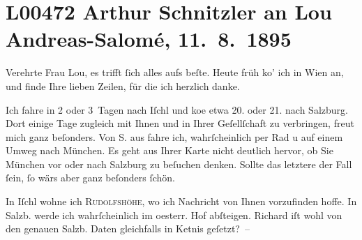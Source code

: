 

\section[Arthur Schnitzler an Lou Andreas-Salomé, 11. 8. 1895]{L00472 Arthur Schnitzler an Lou Andreas-Salomé, 11. 8. 1895}
\nopagebreak{}
\rehead{ }\normalsize\beginnumbering{}
\toendnotes[C]{\smallbreak\pagebreak[2]}
\pstart{}{\pb}Verehrte Frau Lou,\pend\vspace{0.5em}
\pstart
           es trifft ſich alles aufs beſte. Heute früh ko{\geminationm}’ ich in
                  Wien an, und  finde Ihre lieben Zeilen, für die ich herzlich danke.\pend
           
\pstart
           Ich fahre in 2 oder 3 Tagen nach Iſchl und ko{\geminationm}e etwa 20. oder 21. nach Salzburg. Dort einige Tage zugleich mit Ihnen und
               in Ihrer Geſellſchaft zu verbringen, freut {\pb}mich ganz beſonders. Von S. aus fahre ich, wahrſcheinlich per Rad u auf
               einem Umweg nach München. Es geht aus Ihrer
               Karte nicht deutlich hervor, ob Sie München vor
               oder nach Salzburg zu beſuchen denken. Sollte das
               letztere der Fall ſein, ſo wärs aber ganz beſonders ſchön.\pend
           
\pstart
           In Iſchl wohne ich \textsc{Rudolfshöhe}, {\pb}wo ich Nachricht von Ihnen vorzufinden hoffe. In Salzb. werde ich wahrſcheinlich im oesterr. Hof abſteigen. Richard iſt wohl von den genauen Salzb.
               Daten gleichfalls in Ke{\geminationn}tnis geſetzt? – \pend
           
